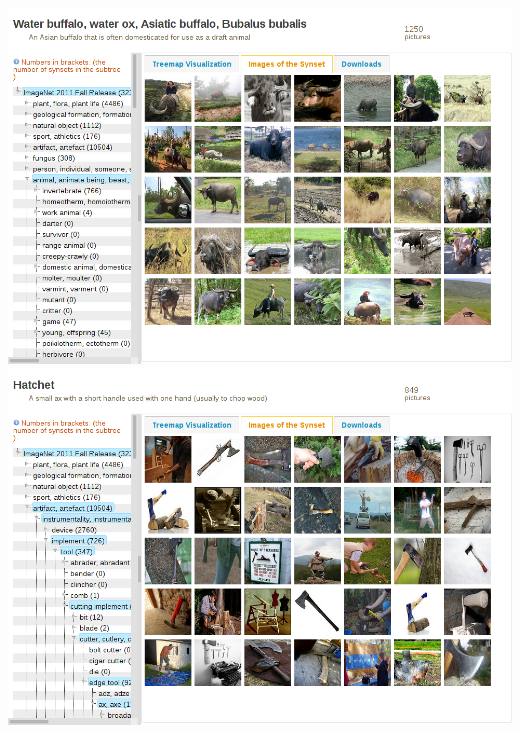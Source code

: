 \documentclass[c,8pt]{beamer}
\begin{document}
\begin{frame}{}{}
\begin{center}
{
%
\includegraphics[scale=0.1]{pics/imagenet2012/imagenet2012_water-buffalo.png}
%
%
\includegraphics[scale=0.1]{pics/imagenet2012/imagenet2012_hatchet.png}
%

}

\end{center}

\vspace*{-1em}



\note[2]{

}
\end{frame}
\end{document}
